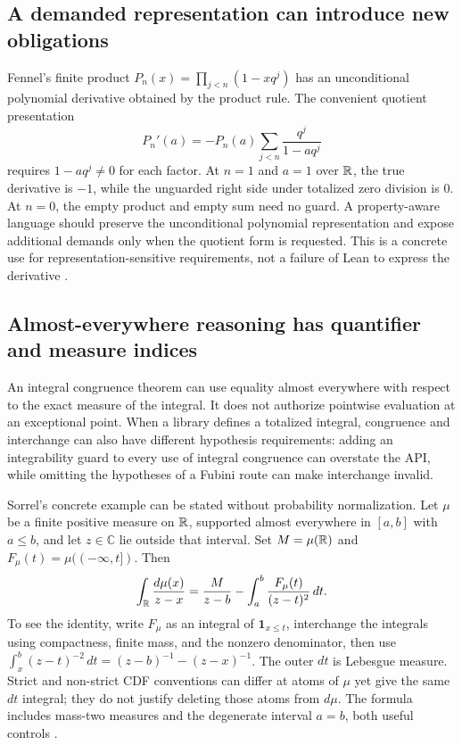 \documentclass[11pt,letterpaper]{article}
\theoremstyle{definition}\newtheorem{definition}[proposition]{Definition}
\theoremstyle{remark}\newtheorem{remark}[proposition]{Remark}
\begin{document}
\subsection{A demanded representation can introduce new obligations}

Fennel's finite product $P_n(x)=\prod_{j<n}(1-xq^j)$ has an unconditional
polynomial derivative obtained by the product rule. The convenient quotient
presentation
\[
 P_n'(a)=-P_n(a)\sum_{j<n}\frac{q^j}{1-aq^j}
\]
requires $1-aq^j\ne0$ for each factor. At $n=1$ and $a=1$ over $\mathbb R$, the
true derivative is $-1$, while the unguarded right side under totalized
zero division is $0$. At $n=0$, the empty product and empty sum need no guard.
A property-aware language should preserve the unconditional polynomial
representation and expose additional demands only when the quotient form is
requested. This is a concrete use for representation-sensitive requirements,
not a failure of Lean to express the derivative \cite{fennel}.

\subsection{Almost-everywhere reasoning has quantifier and measure indices}

An integral congruence theorem can use equality almost everywhere with
respect to the exact measure of the integral. It does not authorize
pointwise evaluation at an exceptional point. When a library defines a
totalized integral, congruence and interchange can also have different
hypothesis requirements: adding an integrability guard to every use of
integral congruence can overstate the API, while omitting the hypotheses of
a Fubini route can make interchange invalid.

Sorrel's concrete example can be stated without probability normalization.
Let $\mu$ be a finite positive measure on $\mathbb R$, supported almost everywhere
in $[a,b]$ with $a\le b$, and let $z\in\mathbb C$ lie outside that interval.
Set $M=\mu(\mathbb R)$ and $F_\mu(t)=\mu(({-\infty},t])$. Then
\[
 \int_\mathbb R\frac{d\mu(x)}{z-x}
 =\frac{M}{z-b}-\int_a^b\frac{F_\mu(t)}{(z-t)^2}\,dt.
\]
To see the identity, write $F_\mu$ as an integral of $\mathbf1_{x\le t}$,
interchange the integrals using compactness, finite mass, and the nonzero
denominator, then use
$\int_x^b(z-t)^{-2}\,dt=(z-b)^{-1}-(z-x)^{-1}$.
The outer $dt$ is Lebesgue measure. Strict and non-strict CDF conventions
can differ at atoms of $\mu$ yet give the same $dt$ integral; they do not
justify deleting those atoms from $d\mu$. The formula includes mass-two
measures and the degenerate interval $a=b$, both useful controls
\cite{sorrel}.
\end{document}
